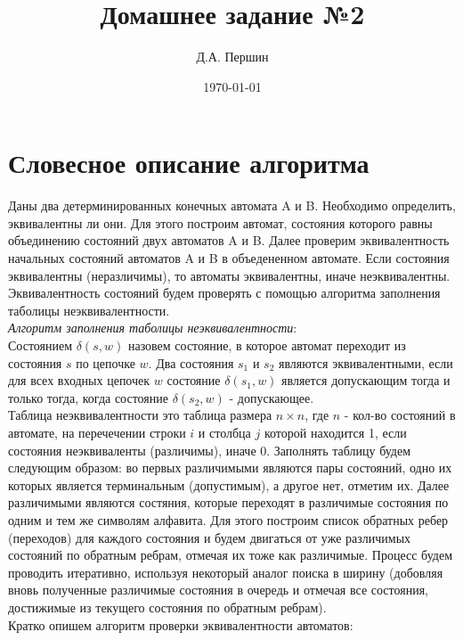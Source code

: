 \documentclass[12pt]{article}
\title{\bf Домашнее задание №2}
\author{Д.А. Першин}
\date{\today}
\begin{document}
\maketitle


\section{Словесное описание алгоритма}

Даны два детерминированных конечных автомата A и B. Необходимо определить, эквивалентны ли они. Для этого построим автомат, состояния которого равны объединению состояний двух автоматов A и B. Далее проверим эквивалентность начальных состояний автоматов A и B в объедененном автомате. Если состояния эквивалентны (неразличимы), то автоматы эквивалентны, иначе неэквивалентны. Эквивалентность состояний будем проверять с помощью алгоритма заполнения таболицы неэквивалентности.\\

\textit{Алгоритм заполнения таболицы неэквивалентности}:\\
Состоянием $\delta(s,w)$ назовем состояние, в которое автомат переходит из состояния $s$ по цепочке $w$.
Два состояния $s_1$ и $s_2$ являются эквивалентными, если для всех входных цепочек $w$ состояние $\delta(s_1,w)$ является допускающим тогда и только тогда, когда состояние $\delta(s_2,w)$ - допускающее.\\
Таблица неэквивалентности это таблица размера $n\times n$, где $n$ - кол-во состояний в автомате, на перечечении строки $i$ и столбца $j$ которой находится 1, если состояния неэквиваленты (различимы), иначе 0. Заполнять таблицу будем следующим образом: во первых различимыми являются пары состояний, одно их которых является терминальным (допустимым), а другое нет, отметим их. Далее различимыми являются состяния, которые переходят в различимые состояния по одним и тем же символям алфавита. Для этого построим список обратных ребер (переходов) для каждого состояния и будем двигаться от уже различимых состояний по обратным ребрам, отмечая их тоже как различимые. Процесс будем проводить итеративно, используя некоторый аналог поиска в ширину (добовляя вновь полученные различимые состояния в очередь и отмечая все состояния, достижимые из текущего состояния по обратным ребрам).\\

Кратко опишем алгоритм проверки эквивалентности автоматов:
\end{document}
